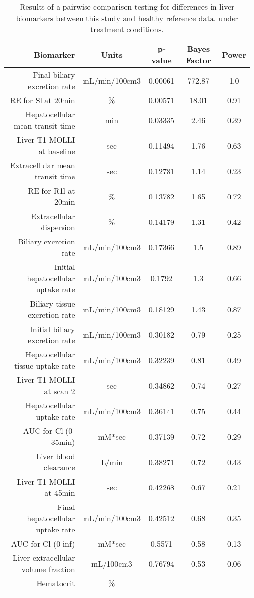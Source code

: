 \documentclass{epflreport}%
\begin{document}
%
\begin{longtable}{rcccc}%
\hline%
Biomarker&Units&p{-}value&Bayes Factor&Power\\%
\hline%
Final biliary excretion rate&mL/min/100cm3&0.00061&772.87&1.0\\%
RE for Sl at 20min&\%&0.00571&18.01&0.91\\%
Hepatocellular mean transit time&min&0.03335&2.46&0.39\\%
Liver T1{-}MOLLI at baseline&sec&0.11494&1.76&0.63\\%
Extracellular mean transit time&sec&0.12781&1.14&0.23\\%
RE for R1l at 20min&\%&0.13782&1.65&0.72\\%
Extracellular dispersion&\%&0.14179&1.31&0.42\\%
Biliary excretion rate&mL/min/100cm3&0.17366&1.5&0.89\\%
Initial hepatocellular uptake rate&mL/min/100cm3&0.1792&1.3&0.66\\%
Biliary tissue excretion rate&mL/min/100cm3&0.18129&1.43&0.87\\%
Initial biliary excretion rate&mL/min/100cm3&0.30182&0.79&0.25\\%
Hepatocellular tissue uptake rate&mL/min/100cm3&0.32239&0.81&0.49\\%
Liver T1{-}MOLLI at scan 2&sec&0.34862&0.74&0.27\\%
Hepatocellular uptake rate&mL/min/100cm3&0.36141&0.75&0.44\\%
AUC for Cl (0{-}35min)&mM*sec&0.37139&0.72&0.29\\%
Liver blood clearance&L/min&0.38271&0.72&0.43\\%
Liver T1{-}MOLLI at 45min&sec&0.42268&0.67&0.21\\%
Final hepatocellular uptake rate&mL/min/100cm3&0.42512&0.68&0.35\\%
AUC for Cl (0{-}inf)&mM*sec&0.5571&0.58&0.13\\%
Liver extracellular volume fraction&mL/100cm3&0.76794&0.53&0.06\\%
Hematocrit&\%&&&\\%
\hline%
\caption{Results of a pairwise comparison testing for differences in liver biomarkers between this study and healthy reference data, under treatment conditions.} \\%
\end{longtable}%
\end{document}

